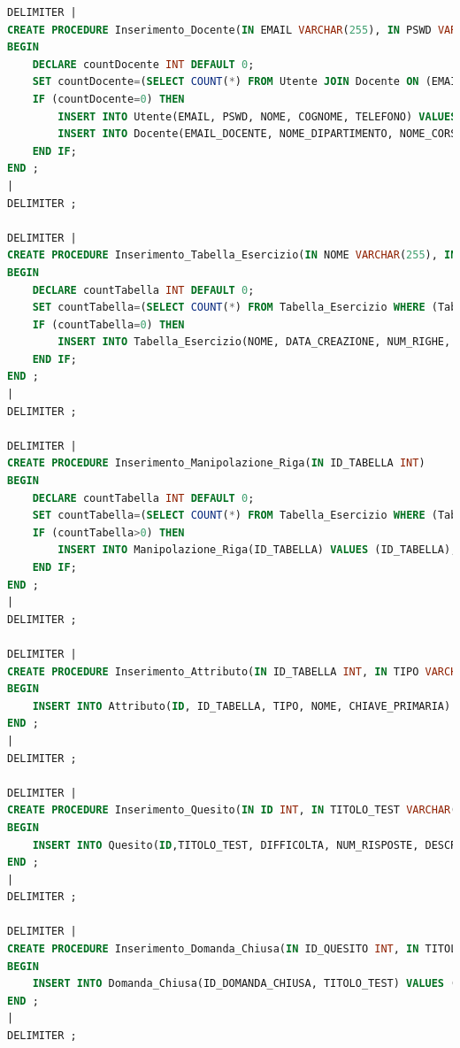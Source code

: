 \documentclass{article}
\begin{document}
\begin{lstlisting}[language=SQL, title=Codice SQL completo delle stored procedure dello schema della basi di dati.]
DELIMITER |
CREATE PROCEDURE Inserimento_Docente(IN EMAIL VARCHAR(255), IN PSWD VARCHAR(255), IN NOME VARCHAR(255), IN COGNOME VARCHAR(255), IN TELEFONO INT(10), IN NOME_DIPARTIMENTO VARCHAR(255), IN NOME_CORSO VARCHAR(16))
BEGIN
	DECLARE countDocente INT DEFAULT 0;
	SET countDocente=(SELECT COUNT(*) FROM Utente JOIN Docente ON (EMAIL=EMAIL_DOCENTE) WHERE (Utente.EMAIL=EMAIL));
	IF (countDocente=0) THEN
		INSERT INTO Utente(EMAIL, PSWD, NOME, COGNOME, TELEFONO) VALUES (EMAIL, PSWD, NOME, COGNOME, TELEFONO);
		INSERT INTO Docente(EMAIL_DOCENTE, NOME_DIPARTIMENTO, NOME_CORSO) VALUES (EMAIL, NOME_DIPARTIMENTO, NOME_CORSO);
	END IF;
END ;
| 
DELIMITER ;

DELIMITER |
CREATE PROCEDURE Inserimento_Tabella_Esercizio(IN NOME VARCHAR(255), IN DATA_CREAZIONE DATETIME, IN NUM_RIGHE INT, IN EMAIL_DOCENTE VARCHAR(255))
BEGIN
	DECLARE countTabella INT DEFAULT 0;
	SET countTabella=(SELECT COUNT(*) FROM Tabella_Esercizio WHERE (Tabella_Esercizio.NOME=NOME));
	IF (countTabella=0) THEN 
		INSERT INTO Tabella_Esercizio(NOME, DATA_CREAZIONE, NUM_RIGHE, EMAIL_DOCENTE) VALUES (NOME, DATA_CREAZIONE, NUM_RIGHE, EMAIL_DOCENTE);
	END IF;   
END ;
| 
DELIMITER ;

DELIMITER |
CREATE PROCEDURE Inserimento_Manipolazione_Riga(IN ID_TABELLA INT)
BEGIN
	DECLARE countTabella INT DEFAULT 0;
	SET countTabella=(SELECT COUNT(*) FROM Tabella_Esercizio WHERE (Tabella_Esercizio.ID=ID_TABELLA));
	IF (countTabella>0) THEN 
		INSERT INTO Manipolazione_Riga(ID_TABELLA) VALUES (ID_TABELLA);
	END IF;   
END ;
| 
DELIMITER ;

DELIMITER |
CREATE PROCEDURE Inserimento_Attributo(IN ID_TABELLA INT, IN TIPO VARCHAR(255), IN NOME VARCHAR(255), IN CHIAVE_PRIMARIA BOOLEAN) 
BEGIN
	INSERT INTO Attributo(ID, ID_TABELLA, TIPO, NOME, CHIAVE_PRIMARIA) VALUES (NULL, ID_TABELLA, TIPO, NOME, CHIAVE_PRIMARIA);
END ;
| 
DELIMITER ;

DELIMITER |
CREATE PROCEDURE Inserimento_Quesito(IN ID INT, IN TITOLO_TEST VARCHAR(255), IN DIFFICOLTA ENUM('BASSO', 'MEDIO', 'ALTO'), IN NUM_RISPOSTE INT, IN DESCRIZIONE VARCHAR(255))
BEGIN
	INSERT INTO Quesito(ID,TITOLO_TEST, DIFFICOLTA, NUM_RISPOSTE, DESCRIZIONE) VALUES (ID,TITOLO_TEST, DIFFICOLTA, NUM_RISPOSTE, DESCRIZIONE);
END ;
| 
DELIMITER ;

DELIMITER |
CREATE PROCEDURE Inserimento_Domanda_Chiusa(IN ID_QUESITO INT, IN TITOLO_TEST VARCHAR(255)) 
BEGIN
	INSERT INTO Domanda_Chiusa(ID_DOMANDA_CHIUSA, TITOLO_TEST) VALUES (ID_QUESITO, TITOLO_TEST);
END ;
| 
DELIMITER ;


\end{lstlisting}
\end{document}
